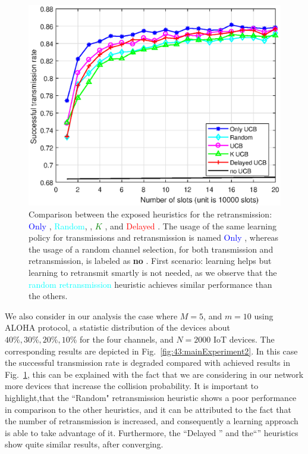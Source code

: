 \begin{figure}[h!]  %
	\centering
	\includegraphics[width=0.75\linewidth]{ResultsUCB.eps}
	\caption[First comparison between the exposed heuristics for the retransmission: Only \UCB, Random, \UCB, $K$ \UCB, and Delayed \UCB]{
		Comparison between the exposed heuristics for the retransmission: \textcolor{blue}{Only \UCB}, \textcolor{cyan}{Random}, \textcolor{purple}{\UCB}, \textcolor{green}{$K$ \UCB}, and \textcolor{red}{Delayed \UCB}.
		The usage of the same learning policy for transmissions and retransmission is named \textcolor{blue}{Only \UCB{}},
		whereas the usage of a random channel selection, for both transmission and retransmission, is labeled as \textbf{no \UCB{}}.
		First scenario: learning helps but learning to retransmit smartly is not needed, as we observe that the \textcolor{cyan}{random retransmission} heuristic achieves similar performance than the others.
	}
	\label{fig:43:mainExperiment1}
\end{figure}

We also consider in our analysis the case where $M=5$, and $m=10$ using ALOHA protocol, a statistic distribution of the devices about $40\%, 30\%, 20\%, 10\%$ for the four channels, and $N=2000$ IoT devices.
The corresponding results are depicted in Fig.~\ref{fig:43:mainExperiment2}.
In this case the successful transmission rate is degraded compared with achieved results in Fig.~\ref{fig:43:mainExperiment1}, this can be explained with the fact that we are considering in our network more devices that increase the collision probability.
It is important to highlight,that the ``Random" retransmission heuristic shows a poor performance in comparison to the other heuristics, and it can be attributed to the fact that the number of retransmission is increased, and consequently a
learning approach is able to take advantage of it.
Furthermore, the ``Delayed \UCB'' and  the``\UCB'' heuristics show quite similar results, after converging.
%


